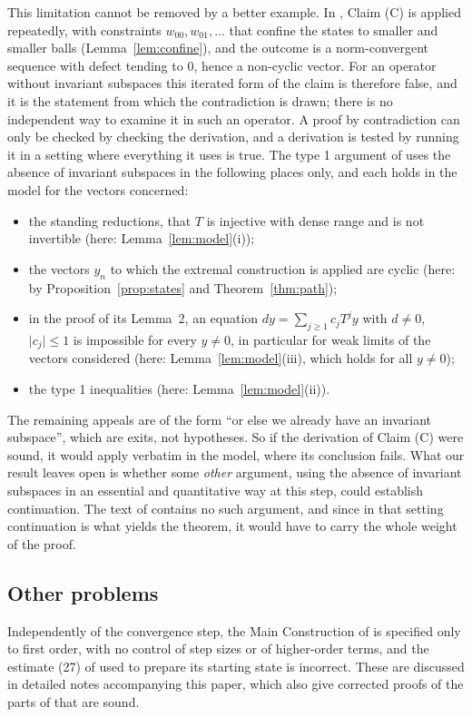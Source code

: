 \documentclass[11pt]{article}
\theoremstyle{definition}
\newcommand{\abs}[1]{\lvert #1\rvert}
\begin{document}
This limitation cannot be removed by a better example. In \cite{E}, Claim (C) is applied
repeatedly, with constraints $w_{00},w_{01},\dots$ that confine the states to smaller and
smaller balls (Lemma~\ref{lem:confine}), and the outcome is a norm-convergent sequence with
defect tending to $0$, hence a non-cyclic vector. For an operator without invariant subspaces
this iterated form of the claim is therefore false, and it is the statement from which the
contradiction is drawn; there is no independent way to examine it in such an operator. A proof
by contradiction can only be checked by checking the derivation, and a derivation is tested by
running it in a setting where everything it uses is true. The type 1 argument of \cite{E} uses the absence of
invariant subspaces in the following places only, and each holds in the model for the vectors
concerned:
\begin{itemize}[leftmargin=2em]
\item the standing reductions, that $T$ is injective with dense range and is not
invertible (here: Lemma~\ref{lem:model}(i));
\item the vectors $y_n$ to which the extremal construction is applied are cyclic (here: by
Proposition~\ref{prop:states} and Theorem~\ref{thm:path});
\item in the proof of its Lemma~2, an equation $dy=\sum_{j\ge1}c_jT^jy$ with $d\ne0$,
$\abs{c_j}\le1$ is impossible for every $y\ne0$, in particular for weak limits of the vectors
considered (here: Lemma~\ref{lem:model}(iii), which holds for all $y\ne0$);
\item the type 1 inequalities (here: Lemma~\ref{lem:model}(ii)).
\end{itemize}
The remaining appeals are of the form ``or else we already have an invariant subspace'',
which are exits, not hypotheses. So if the derivation of Claim (C) were sound, it would apply
verbatim in the model, where its conclusion fails. What our result leaves open is whether
some \emph{other} argument, using the absence of invariant subspaces in an essential and
quantitative way at this step, could establish continuation. The text of \cite{E} contains no
such argument, and since in that setting continuation is what yields the theorem, it would
have to carry the whole weight of the proof.

\subsection*{Other problems}
Independently of the convergence step, the Main Construction of \cite{E} is specified only to
first order, with no control of step sizes or of higher-order terms, and the estimate (27) of
\cite{E} used to prepare its starting state is incorrect. These are discussed in detailed notes
accompanying this paper, which also give corrected proofs of the parts of \cite{E} that are
sound.
\end{document}
